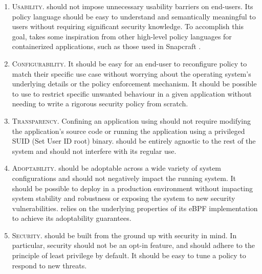 \begin{enumerate}[label=\bfseries D\arabic*., ref=D\arabic*, labelindent=1em]
  \item \label{d:1} \textsc{Usability.}
    \bpfcontain{} should not impose unnecessary usability barriers on end-users.  Its policy language should be easy to understand and semantically meaningful to users without requiring significant security knowledge. To accomplish this goal, \bpfcontain{} takes some inspiration from other high-level policy languages for containerized applications, such as those used in Snapcraft \cite{snap}.

  \item \label{d:2} \textsc{Configurability.}
    It should be easy for an end-user to reconfigure policy to match their specific use case without worrying about the operating system's underlying details or the policy enforcement mechanism. It should be possible to use \bpfcontain{} to restrict specific unwanted behaviour in a given application without needing to write a rigorous security policy from scratch.

  \item \label{d:3} \textsc{Transparency.}
    Confining an application using \bpfcontain{} should not require modifying the application's source code or running the application using a privileged SUID (Set User ID root) binary. \bpfcontain{} should be entirely agnostic to the rest of the system and should not interfere with its regular use.

  \item \label{d:4} \textsc{Adoptability.}
    \bpfcontain{} should be adoptable across a wide variety of system configurations and should not negatively impact the running system. It should be possible to deploy \bpfcontain{} in a production environment without impacting system stability and robustness or exposing the system to new security vulnerabilities. \bpfcontain{} relies on the underlying properties of its eBPF implementation to achieve its adoptability guarantees.

  \item \label{d:5} \textsc{Security.}
    \bpfcontain{} should be built from the ground up with security in mind. In particular, security should not be an opt-in feature, and \bpfcontain{} should adhere to the principle of least privilege \cite{saltzer1975_protection} by default. It should be easy to tune a \bpfcontain{} policy to respond to new threats.
\end{enumerate}

